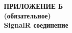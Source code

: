 \begin{center}
\textbf{
\MakeUppercase{Приложение Б}\\
(обязательное)\\
SignalR соединение}
\end{center}

